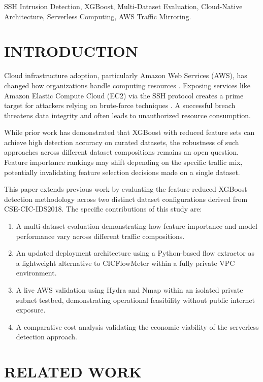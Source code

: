 \documentclass[conference]{IEEEtran}
\begin{document}
\begin{IEEEkeywords}
SSH Intrusion Detection, XGBoost, Multi-Dataset Evaluation, Cloud-Native Architecture, Serverless Computing, AWS Traffic Mirroring.
\end{IEEEkeywords}

\section{INTRODUCTION}

Cloud infrastructure adoption, particularly Amazon Web Services (AWS), has changed how organizations handle computing resources \cite{b12}. Exposing services like Amazon Elastic Compute Cloud (EC2) via the SSH protocol creates a prime target for attackers relying on brute-force techniques \cite{b10, b11, b13}. A successful breach threatens data integrity and often leads to unauthorized resource consumption.

While prior work has demonstrated that XGBoost with reduced feature sets can achieve high detection accuracy on curated datasets, the robustness of such approaches across different dataset compositions remains an open question. Feature importance rankings may shift depending on the specific traffic mix, potentially invalidating feature selection decisions made on a single dataset.

This paper extends previous work by evaluating the feature-reduced XGBoost detection methodology across two distinct dataset configurations derived from CSE-CIC-IDS2018. The specific contributions of this study are:
\begin{enumerate}
\item A multi-dataset evaluation demonstrating how feature importance and model performance vary across different traffic compositions.
\item An updated deployment architecture using a Python-based flow extractor as a lightweight alternative to CICFlowMeter within a fully private VPC environment.
\item A live AWS validation using Hydra and Nmap within an isolated private subnet testbed, demonstrating operational feasibility without public internet exposure.
\item A comparative cost analysis validating the economic viability of the serverless detection approach.
\end{enumerate}


\section{RELATED WORK}
\end{document}
